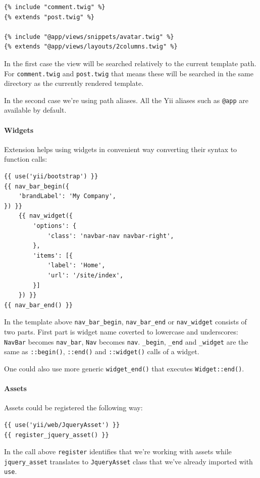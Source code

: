 \begin{lstlisting}
{% include "comment.twig" %}
{% extends "post.twig" %}

{% include "@app/views/snippets/avatar.twig" %}
{% extends "@app/views/layouts/2columns.twig" %}
\end{lstlisting}
In the first case the view will be searched relatively to the current template path. For \lstinline|comment.twig| and \lstinline|post.twig|
that means these will be searched in the same directory as the currently rendered template.

In the second case we're using path aliases. All the Yii aliases such as \lstinline|@app| are available by default.

\paragraph{Widgets}
Extension helps using widgets in convenient way converting their syntax to function calls:

\begin{lstlisting}
{{ use('yii/bootstrap') }}
{{ nav_bar_begin({
    'brandLabel': 'My Company',
}) }}
    {{ nav_widget({
        'options': {
            'class': 'navbar-nav navbar-right',
        },
        'items': [{
            'label': 'Home',
            'url': '/site/index',
        }]
    }) }}
{{ nav_bar_end() }}
\end{lstlisting}
In the template above \lstinline|nav_bar_begin|, \lstinline|nav_bar_end| or \lstinline|nav_widget| consists of two parts. First part is widget name
coverted to lowercase and underscores: \lstinline|NavBar| becomes \lstinline|nav_bar|, \lstinline|Nav| becomes \lstinline|nav|. \lstinline|_begin|, \lstinline|_end| and \lstinline|_widget|
are the same as \lstinline|::begin()|, \lstinline|::end()| and \lstinline|::widget()| calls of a widget.

One could also use more generic \lstinline|widget_end()| that executes \lstinline|Widget::end()|.

\paragraph{Assets}
Assets could be registered the following way:

\begin{lstlisting}
{{ use('yii/web/JqueryAsset') }}
{{ register_jquery_asset() }}
\end{lstlisting}
In the call above \lstinline|register| identifies that we're working with assets while \lstinline|jquery_asset| translates to \lstinline|JqueryAsset|
class that we've already imported with \lstinline|use|.

